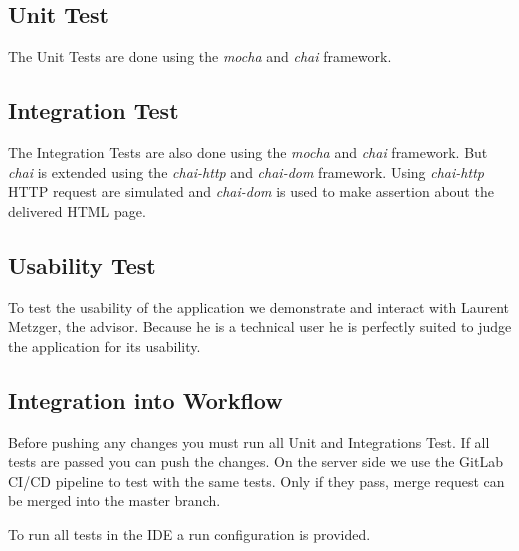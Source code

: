 \subsection{Unit Test}
The Unit Tests are done using the \textit{mocha} and \textit{chai} framework.

\subsection{Integration Test}
The Integration Tests are also done using the \textit{mocha} and \textit{chai} framework.
But \textit{chai} is extended using the \textit{chai-http} and \textit{chai-dom} framework.
Using \textit{chai-http} HTTP request are simulated and \textit{chai-dom} is used to make assertion about the delivered HTML page.

\subsection{Usability Test}
To test the usability of the application we demonstrate and interact with Laurent Metzger, the advisor.
Because he is a technical user he is perfectly suited to judge the application for its usability.

\subsection{Integration into Workflow}
Before pushing any changes you must run all Unit and Integrations Test.
If all tests are passed you can push the changes.
On the server side we use the GitLab CI/CD pipeline to test with the same tests.
Only if they pass, merge request can be merged into the master branch.

To run all tests in the IDE a run configuration is provided.

